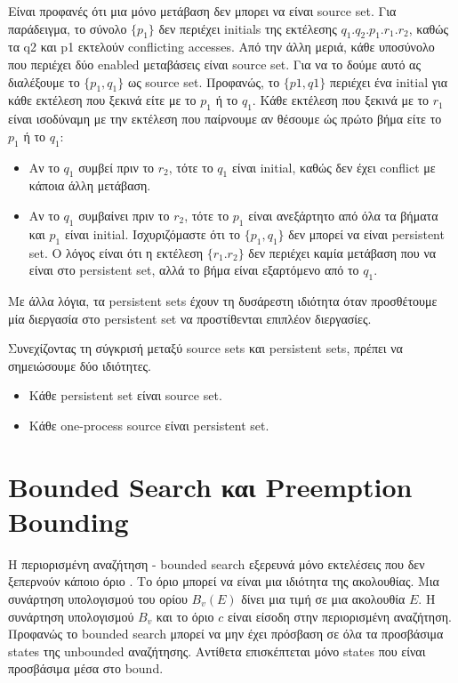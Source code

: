 Είναι προφανές ότι μια μόνο μετάβαση δεν μπορει να είναι source set. Για παράδειγμα,
το σύνολο $\{ p_1 \}$ δεν περιέχει initials της εκτέλεσης $q_1.q_2.p_1.r_1.r_2$,
καθώς τα q2 και p1 εκτελούν conflicting accesses. Από την άλλη μεριά, κάθε υποσύνολο
που περιέχει δύο enabled μεταβάσεις είναι source set. Για να το δούμε αυτό ας διαλέξουμε το
$\{p_1, q_1 \}$ ως source set. Προφανώς, το $\{p1, q1 \}$ περιέχει ένα initial για κάθε εκτέλεση
που ξεκινά είτε με το $p_1$ ή το $q_1$. Κάθε εκτέλεση που ξεκινά με το $r_1$ είναι 
ισοδύναμη με την εκτέλεση που παίρνουμε αν θέσουμε ώς πρώτο βήμα είτε το $p_1$ ή το $q_1$:

\begin{itemize}
\item Αν το $q_1$ συμβεί πριν το $r_2$, τότε το $q_1$ είναι initial, καθώς δεν έχει conflict
με κάποια άλλη μετάβαση.
\item Αν το $q_1$ συμβαίνει πριν το $r_2$, τότε το $p_1$ είναι ανεξάρτητο από όλα τα βήματα και $p_1$ είναι initial.
Ισχυριζόμαστε ότι το $\{p_1, q_1 \}$ δεν μπορεί να είναι persistent set. Ο λόγος είναι ότι η εκτέλεση $\{r_1.r_2 \}$ δεν περιέχει καμία μετάβαση που να είναι
στο persistent set, αλλά το βήμα είναι εξαρτόμενο από το $q_1$. 
\end{itemize}

Με άλλα λόγια, τα persistent sets έχουν τη δυσάρεστη ιδιότητα όταν προσθέτουμε μία διεργασία στο
persistent set να προστίθενται επιπλέον διεργασίες.

Συνεχίζοντας τη σύγκρισή μεταξύ source sets και persistent sets, 
πρέπει να σημειώσουμε δύο ιδιότητες.

\begin{itemize}
\item Κάθε persistent set είναι source set.
\item Κάθε one-process source είναι persistent set.
\end{itemize}


\section{Bounded Search και Preemption Bounding}

Η περιορισμένη αναζήτηση - bounded search εξερευνά μόνο εκτελέσεις που δεν ξεπερνούν κάποιο όριο \cite{BPOR,Thomson}. 
Το όριο μπορεί να είναι μια ιδιότητα της ακολουθίας.
Μια συνάρτηση υπολογισμού του ορίου $B_v(E)$
δίνει μια τιμή σε μια ακολουθία $E$.
Η συνάρτηση υπολογισμού $B_v$ και το όριο $c$ είναι είσοδη στην περιορισμένη αναζήτηση.
Προφανώς το bounded search μπορεί να μην έχει πρόσβαση σε όλα τα προσβάσιμα states της unbounded αναζήτησης.
Αντίθετα επισκέπτεται μόνο states που είναι προσβάσιμα μέσα στο bound.

